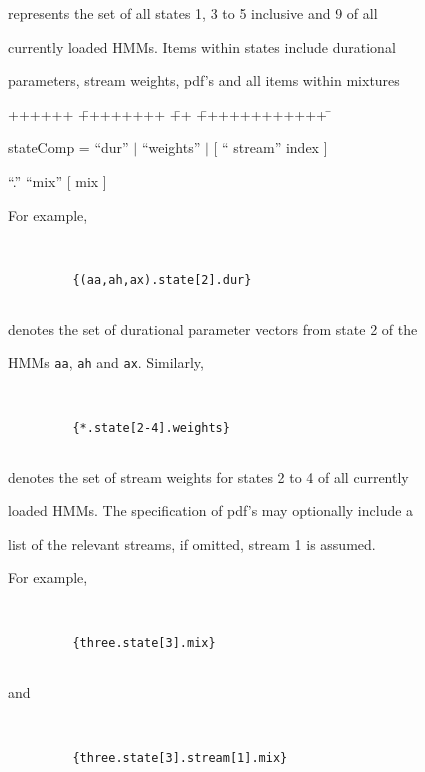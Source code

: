 represents the set of all states 1, 3 to 5 inclusive and 9 of all


currently loaded HMMs.  Items within states include durational


parameters, stream weights, pdf's and all items within mixtures


{\sf


\begin{tabbing}


++++++ \= ++++++++ \= ++ \= ++++++++++++ \=  \kill


\>   stateComp \>  = \> ``dur'' $|$ ``weights'' $|$ [ `` stream'' index ]


        ``.'' ``mix'' [ mix ]


\end{tabbing}}


For example, 


\begin{verbatim}


         {(aa,ah,ax).state[2].dur}


\end{verbatim}


denotes the set of durational parameter vectors from state 2 of the


HMMs \texttt{aa}, \texttt{ah} and \texttt{ax}.  Similarly, 


\begin{verbatim}


         {*.state[2-4].weights}


\end{verbatim}


denotes the set of stream weights for states 2 to 4 of all currently


loaded HMMs.  The specification of pdf's may optionally include a


list of the relevant streams, if omitted, stream 1 is assumed.


For example,


\begin{verbatim}


         {three.state[3].mix}


\end{verbatim}


and


\begin{verbatim}


         {three.state[3].stream[1].mix}


\end{verbatim}



